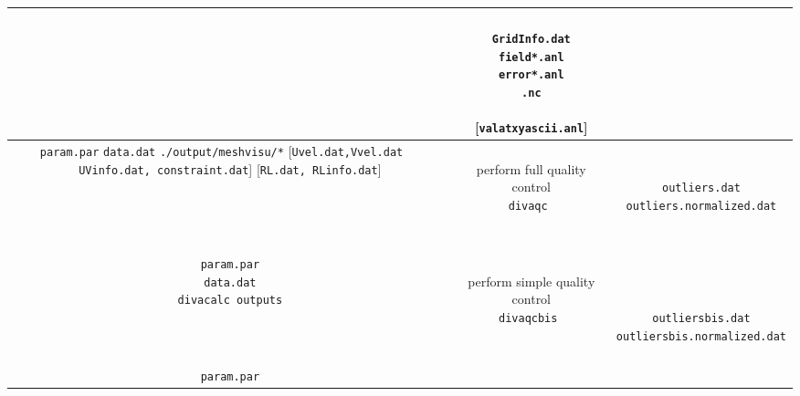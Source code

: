 \begin{table}[H]
{{\begin{tabular}{c|c|c}
{{  { }  }
}
& 
\shortstack{
{  { }  } \\
{\tt GridInfo.dat} \\
{\tt field*.anl} \\
{\tt error*.anl} \\
{\tt *.nc} \\
{  { }  } \\
{[{\tt valatxyascii.anl}]}
} 
\\ \hline
 \shortstack{
 {  { }  } \\
 {\tt param.par} \\
 {\tt data.dat} \\
 {\tt ./output/meshvisu/*} \\
 {[{\tt Uvel.dat,Vvel.dat}} \\
 { $\quad ${\tt UVinfo.dat, constraint.dat}]} \\
 {[{\tt RL.dat, RLinfo.dat}]} 
}
 & 
\shortstack{
{  { }  } \\
{\sf perform full quality control} \\
{\tt divaqc    } 
\\
{  { }  } \\
{  { }  } \\
{  { }  }
}
& 
\shortstack{
{  { }  } \\
{  { }  } \\
{{\tt outliers.dat}} \\
{{\tt outliers.normalized.dat}} \\
{  { }  } \\
{  { }  } 
} 
\\ \hline
 \shortstack{
 {\tt param.par} \\
 {\tt data.dat} \\
{\tt divacalc outputs}
}
 & 
\shortstack{
{  { }  } \\
{\sf perform simple quality control} \\
{\tt divaqcbis } 
\\
{  { }  } \\
{  { }  } \\
{  { }  }
}
& 
\shortstack{
{  { }  } \\
{  { }  } \\
{  { }  } \\
{{\tt outliersbis.dat}} \\
{{\tt outliersbis.normalized.dat}} \\
{  { }  } \\
{  { }  } 
} 
\\ \hline
 \shortstack{
 {\tt param.par} \\
}
\end{tabular}}}
\end{table}

